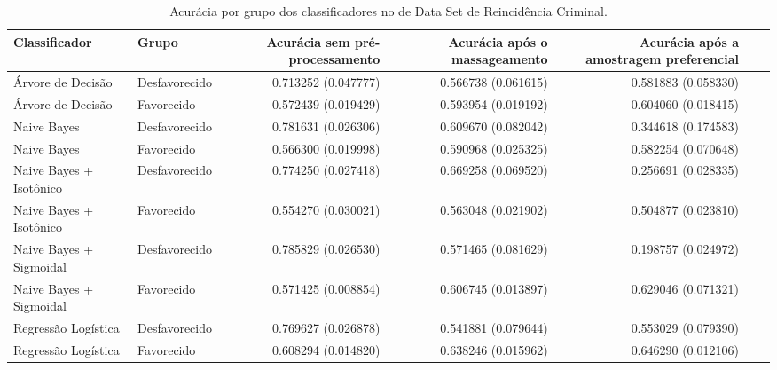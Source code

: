 \begin{table}
    \centering
    \caption{Acurácia por grupo dos classificadores no de Data Set de Reincidência Criminal.}
    \label{table:grupoRecindCompleto}
    \begin{tabular}{llrrrrr}
    \toprule
    Classificador           &  Grupo        &  Acurácia sem pré-processamento    &  Acurácia após o massageamento  &  Acurácia após a amostragem preferencial  \\    
    \midrule
    Árvore de Decisão       &  Desfavorecido &    0.713252 (0.047777)            &  0.566738 (0.061615)            &  0.581883 (0.058330)   \\
    Árvore de Decisão       &     Favorecido &     0.572439 (0.019429)           &  0.593954 (0.019192)             & 0.604060 (0.018415)   \\    
    Naive Bayes              &  Desfavorecido &    0.781631 (0.026306)          &  0.609670 (0.082042)              &  0.344618 (0.174583)   \\
    Naive Bayes              &     Favorecido &   0.566300 (0.019998)             & 0.590968 (0.025325)             &  0.582254 (0.070648)   \\
    Naive Bayes + Isotônico   &  Desfavorecido &   0.774250 (0.027418)         &   0.669258 (0.069520)               &   0.256691 (0.028335)   \\
    Naive Bayes + Isotônico   &     Favorecido &     0.554270 (0.030021)         &  0.563048 (0.021902)              &  0.504877 (0.023810)    \\
    Naive Bayes + Sigmoidal    &  Desfavorecido &    0.785829 (0.026530)        &  0.571465 (0.081629)              &  0.198757 (0.024972)     \\
    Naive Bayes + Sigmoidal    &     Favorecido &    0.571425 (0.008854)        &  0.606745 (0.013897)              & 0.629046 (0.071321)      \\
    Regressão Logística        &  Desfavorecido &   0.769627 (0.026878)                   &   0.541881 (0.079644)        & 0.553029 (0.079390)      \\
    Regressão Logística        &     Favorecido &   0.608294 (0.014820)                   &   0.638246 (0.015962)            & 0.646290 (0.012106)       \\
    \bottomrule
    \end{tabular}
    \end{table}